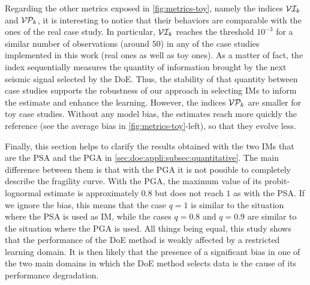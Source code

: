     Regarding the other metrics exposed in  \cref{fig:metrics-toy}, namely the indices $\mathcal{V}\mathcal{I}_k$ and $\mathcal{V}\mathcal{P}_k$, it is interesting to notice that their behaviors are comparable with the ones of the real case study. In particular, $\mathcal{V}\mathcal{I}_k$ reaches the threshold $10^{-3}$ for a similar number of observations (around $50$) in any of the case studies implemented in this work (real ones as well as toy ones).
    As a matter of fact, the index sequentially measures the quantity of information brought by the next seismic signal selected by the DoE. Thus, the stability of that quantity between case studies supports the robustness of our approach in selecting IMs to inform the estimate and enhance the learning.
    However, the indices $\mathcal{V}\mathcal{P}_k$ are smaller for toy case studies. Without any model bias, the estimates reach more quickly the reference (see the average bias in  \cref{fig:metrics-toy}-left), so that they evolve less.
    
    
    {Finally, this section helps to clarify the results obtained with the two IMs that are the PSA and the PGA in \cref{sec:doe:appli:subsec:quantitative}. The main difference between them is that with the PGA it is not possible to completely describe the fragility curve. With the PGA, the maximum value of its probit-lognormal estimate is approximately $0.8$ but does not reach $1$ as with the PSA. If we ignore the bias, this means that the case $q=1$ is similar to the situation where the PSA is used as IM, while the cases  $q=0.8$ and $q=0.9$ are similar to the situation where the PGA is used. All things being equal, this study shows that the performance of the DoE method is weakly affected by a restricted learning domain. It is then likely that the presence of a significant bias in one of the two main domains in which the DoE method selects data is the cause of its performance degradation.}
    
